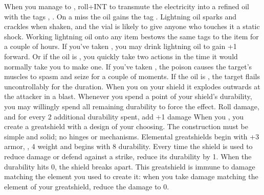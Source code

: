 \documentclass[]{dw_playbook}
\begin{document}
\pageThree
    {
        \advancedMovesCont
    }
    {
            {When you manage to , roll+INT to transmute the electricity into a refined oil with the tags , .  On a miss the oil gains the tag .  Lightning oil sparks and crackles when shaken, and the vial is likely to give anyone who touches it a static shock.  Working lightning oil onto any item bestows the same tags to the item for a couple of hours.
            \gap
            If you’ve taken , you may drink lightning oil to gain +1 forward.  Or if the oil is , you quickly take two actions in the time it would normally take you to make one.
            \gap
            If you’ve taken , the poison causes the target’s muscles to spasm and seize for a couple of moments.  If the oil is , the target flails uncontrollably for the duration.}
        \gap
            {When you  on your shield it explodes outwards at the attacker in a  blast.
            \gap
            Whenever you spend a point of your shield’s durability, you may willingly spend all remaining durability to force the effect.  Roll damage, and for every 2 additional durability spent, add +1 damage}
            {When you , you create a greatshield with a design of your choosing.  The construction must be simple and solid; no hinges or mechanisms.  Elemental greatshields begin with +3 armor, , 4 weight and begins with 8 durability.
            \gap
            Every time the shield is used to reduce damage or defend against a strike, reduce its durability by 1.  When the durability hits 0, the shield breaks apart.  This greatshield is immune to damage matching the element you used to create it: when you take damage matching the element of your greatshield, reduce the damage to 0.
}}
\end{document}
